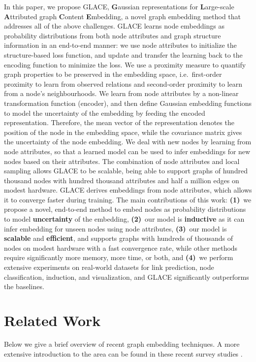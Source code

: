 \documentclass[runningheads]{llncs}
\begin{document}
In this paper, we propose GLACE, \textbf{G}aussian representations for \textbf{L}arge-scale \textbf{A}ttributed graph \textbf{C}ontent \textbf{E}mbedding, a novel graph embedding method that addresses all of the above challenges. GLACE learns node embeddings as probability distributions from both node attributes and graph structure information in an end-to-end manner: we use node attributes to initialize the structure-based loss function, and update and transfer the learning back to the encoding function to minimize the loss. 
We use a proximity measure to quantify graph properties to be preserved in the embedding space, i.e.\ first-order proximity to learn from observed relations and second-order proximity to learn from a node's neighbourhoods. 
We learn from node attributes by a non-linear transformation function (encoder), and then define Gaussian embedding functions to model the uncertainty of the embedding by feeding the encoded representation. Therefore, the mean vector of the representation denotes the position of the node in the embedding space, while the covariance matrix gives the uncertainty of the node embedding. 
We deal with new nodes by learning from node attributes, so that a learned model can be used to infer embeddings for new nodes based on their attributes. 
The combination of node attributes and local sampling allows GLACE to be scalable, being able to support graphs of hundred thousand nodes with hundred thousand attributes and half a million edges on modest hardware. 
GLACE derives embeddings from node attributes, which allows it to converge faster during training. 
The main contributions of this work:
\textbf{(1)}~we propose a novel, end-to-end method to embed nodes as probability distributions to model \textbf{uncertainty} of the embedding, 
\textbf{(2)}~our model is \textbf{inductive} as it can infer embedding for unseen nodes using node attributes,
\textbf{(3)}~our model is \textbf{scalable} and \textbf{efficient}, and supports graphs with hundreds of thousands of nodes on modest hardware with a fast convergence rate, while other methods require significantly more memory, more time, or both,
and
\textbf{(4)}~we perform extensive experiments on real-world datasets for link prediction, node classification, induction, and visualization, and GLACE significantly outperforms the baselines.
 \section{Related Work}

Below we give a brief overview of recent graph embedding techniques. A more extensive introduction to the area can be found in these recent survey studies \cite{DBLP:survey1,DBLP:survey3,DBLP:survey2}.
\end{document}

